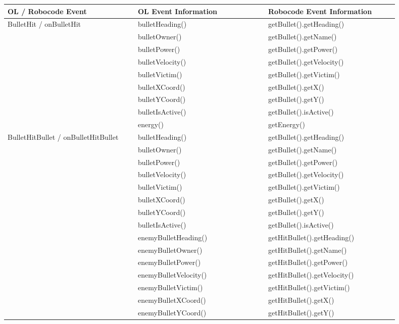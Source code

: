 \begin{center}
	\begin{tabular}{ | p{0.3\linewidth} | p{0.3\linewidth} | p{0.3\linewidth} |}
		\hline
		OL / Robocode Event& OL Event Information & Robocode Event Information \\ \hline
		BulletHit / onBulletHit& bulletHeading() & getBullet().getHeading() \\ \hline
		& bulletOwner() & getBullet().getName() \\ \hline
		& bulletPower() & getBullet().getPower() \\ \hline
		& bulletVelocity() & getBullet().getVelocity() \\ \hline
		& bulletVictim() & getBullet().getVictim() \\ \hline
		& bulletXCoord() & getBullet().getX() \\ \hline
		& bulletYCoord() & getBullet().getY() \\ \hline
		& bulletIsActive() & getBullet().isActive() \\ \hline
		& energy() & getEnergy() \\ \hline
		BulletHitBullet / onBulletHitBullet& bulletHeading() & getBullet().getHeading() \\ \hline
		& bulletOwner() & getBullet().getName() \\ \hline
		& bulletPower() & getBullet().getPower() \\ \hline
		& bulletVelocity() & getBullet().getVelocity() \\ \hline
		& bulletVictim() & getBullet().getVictim() \\ \hline
		& bulletXCoord() & getBullet().getX() \\ \hline
		& bulletYCoord() & getBullet().getY() \\ \hline
		& bulletIsActive() & getBullet().isActive() \\ \hline
		& enemyBulletHeading() & getHitBullet().getHeading() \\ \hline
		& enemyBulletOwner() & getHitBullet().getName() \\ \hline
		& enemyBulletPower() & getHitBullet().getPower() \\ \hline
		& enemyBulletVelocity() & getHitBullet().getVelocity() \\ \hline
		& enemyBulletVictim() & getHitBullet().getVictim() \\ \hline
		& enemyBulletXCoord() & getHitBullet().getX() \\ \hline
		& enemyBulletYCoord() & getHitBullet().getY() \\ \hline

\end{tabular}
\end{center}
